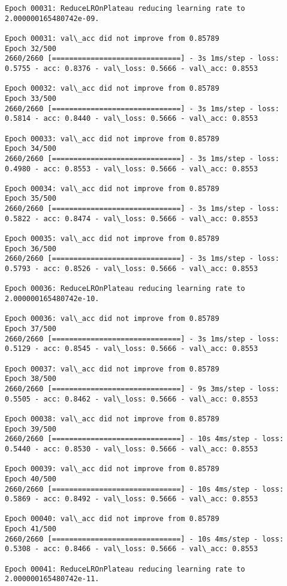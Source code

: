 \documentclass[11pt]{article}
\begin{document}
\begin{Verbatim}[commandchars=\\\{\}]
Epoch 00031: ReduceLROnPlateau reducing learning rate to 2.000000165480742e-09.

Epoch 00031: val\_acc did not improve from 0.85789
Epoch 32/500
2660/2660 [==============================] - 3s 1ms/step - loss: 0.5755 - acc: 0.8376 - val\_loss: 0.5666 - val\_acc: 0.8553

Epoch 00032: val\_acc did not improve from 0.85789
Epoch 33/500
2660/2660 [==============================] - 3s 1ms/step - loss: 0.5814 - acc: 0.8440 - val\_loss: 0.5666 - val\_acc: 0.8553

Epoch 00033: val\_acc did not improve from 0.85789
Epoch 34/500
2660/2660 [==============================] - 3s 1ms/step - loss: 0.4980 - acc: 0.8553 - val\_loss: 0.5666 - val\_acc: 0.8553

Epoch 00034: val\_acc did not improve from 0.85789
Epoch 35/500
2660/2660 [==============================] - 3s 1ms/step - loss: 0.5822 - acc: 0.8474 - val\_loss: 0.5666 - val\_acc: 0.8553

Epoch 00035: val\_acc did not improve from 0.85789
Epoch 36/500
2660/2660 [==============================] - 3s 1ms/step - loss: 0.5793 - acc: 0.8526 - val\_loss: 0.5666 - val\_acc: 0.8553

Epoch 00036: ReduceLROnPlateau reducing learning rate to 2.000000165480742e-10.

Epoch 00036: val\_acc did not improve from 0.85789
Epoch 37/500
2660/2660 [==============================] - 3s 1ms/step - loss: 0.5129 - acc: 0.8545 - val\_loss: 0.5666 - val\_acc: 0.8553

Epoch 00037: val\_acc did not improve from 0.85789
Epoch 38/500
2660/2660 [==============================] - 9s 3ms/step - loss: 0.5505 - acc: 0.8462 - val\_loss: 0.5666 - val\_acc: 0.8553

Epoch 00038: val\_acc did not improve from 0.85789
Epoch 39/500
2660/2660 [==============================] - 10s 4ms/step - loss: 0.5440 - acc: 0.8530 - val\_loss: 0.5666 - val\_acc: 0.8553

Epoch 00039: val\_acc did not improve from 0.85789
Epoch 40/500
2660/2660 [==============================] - 10s 4ms/step - loss: 0.5869 - acc: 0.8492 - val\_loss: 0.5666 - val\_acc: 0.8553

Epoch 00040: val\_acc did not improve from 0.85789
Epoch 41/500
2660/2660 [==============================] - 10s 4ms/step - loss: 0.5308 - acc: 0.8466 - val\_loss: 0.5666 - val\_acc: 0.8553

Epoch 00041: ReduceLROnPlateau reducing learning rate to 2.000000165480742e-11.


\end{Verbatim}
\end{document}
